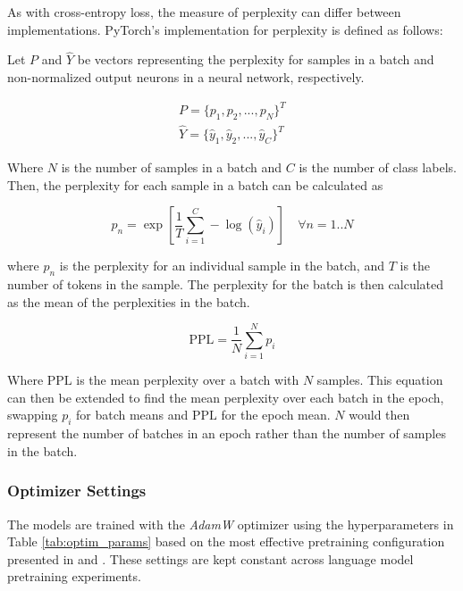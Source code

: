 \documentclass[12pt]{article}
\begin{document}
As with cross-entropy loss, the measure of perplexity can differ between implementations. PyTorch's \cite{paszke_pytorch_2019} implementation for
perplexity is defined as follows:

Let $P$ and $\hat{Y}$ be vectors representing the perplexity for samples in a batch and non-normalized output neurons in a neural network,
respectively.

\begin{equation}\label{eq:perplexity_defs}
    \begin{gathered}
        P = \{p_1, p_2, ..., p_N\}^T\\
        \hat{Y} = \{\hat{y}_1, \hat{y}_2, ..., \hat{y}_C\}^T
    \end{gathered}
\end{equation}

\noindent
Where $N$ is the number of samples in a batch and $C$ is the number of class labels. Then, the perplexity for each sample in a batch can be
calculated as

\begin{equation}\label{eq:perplexity}
    p_n = \exp \left[ \frac{1}{T}\sum_{i=1}^C - \log(\hat{y}_i) \right] \quad \forall n = 1..N
\end{equation}

\noindent
where $p_n$ is the perplexity for an individual sample in the batch, and $T$ is the number of tokens in the sample. The perplexity for the batch is
then calculated as the mean of the perplexities in the batch.

\begin{equation}\label{eq:perplexity_mean}
    \mbox{PPL} = \frac{1}{N}\sum_{i=1}^{N}p_i
\end{equation}

\noindent
Where $\mbox{PPL}$ is the mean perplexity over a batch with $N$ samples. This equation can then be extended to find the mean perplexity over each
batch in the epoch, swapping $p_i$ for batch means and $\mbox{PPL}$ for the epoch mean. $N$ would then represent the number of batches in an epoch
rather than the number of samples in the batch.

\subsubsection{Optimizer Settings}

The models are trained with the \textit{AdamW} optimizer \cite{loshchilov_decoupled_2019} using the hyperparameters in Table \ref{tab:optim_params}
based on the most effective pretraining configuration presented in \cite{devlin_bert_2019} and \cite{liu_roberta_2019}. These settings are kept
constant across language model pretraining experiments.
\end{document}
